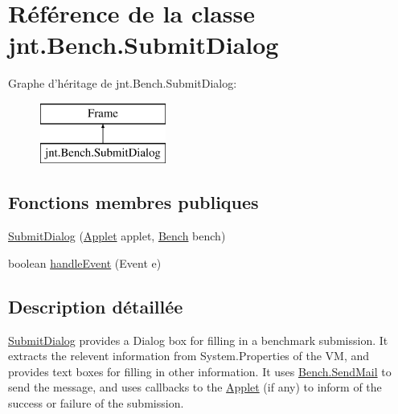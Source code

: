 \hypertarget{classjnt_1_1Bench_1_1SubmitDialog}{\section{Référence de la classe jnt.\-Bench.\-Submit\-Dialog}
\label{classjnt_1_1Bench_1_1SubmitDialog}
}
Graphe d'héritage de jnt.\-Bench.\-Submit\-Dialog\-:\begin{figure}[H]
\begin{center}
\leavevmode
\includegraphics[height=2.000000cm]{d0/da7/classjnt_1_1Bench_1_1SubmitDialog}
\end{center}
\end{figure}
\subsection*{Fonctions membres publiques}
\begin{DoxyCompactItemize}
\item 
\hyperlink{classjnt_1_1Bench_1_1SubmitDialog_ac6dc8de0e644ad60f8f5faf4e91b2837}{Submit\-Dialog} (\hyperlink{classjnt_1_1Bench_1_1Applet}{Applet} applet, \hyperlink{classjnt_1_1Bench_1_1Bench}{Bench} bench)
\item 
boolean \hyperlink{classjnt_1_1Bench_1_1SubmitDialog_a27946c9f56eab29a4fb8695e485e71f6}{handle\-Event} (Event e)
\end{DoxyCompactItemize}


\subsection{Description détaillée}
\hyperlink{classjnt_1_1Bench_1_1SubmitDialog}{Submit\-Dialog} provides a Dialog box for filling in a benchmark submission. It extracts the relevent information from System.\-Properties of the V\-M, and provides text boxes for filling in other information. It uses \hyperlink{classjnt_1_1Bench_1_1SendMail}{Bench.\-Send\-Mail} to send the message, and uses callbacks to the \hyperlink{classjnt_1_1Bench_1_1Applet}{Applet} (if any) to inform of the success or failure of the submission. 

